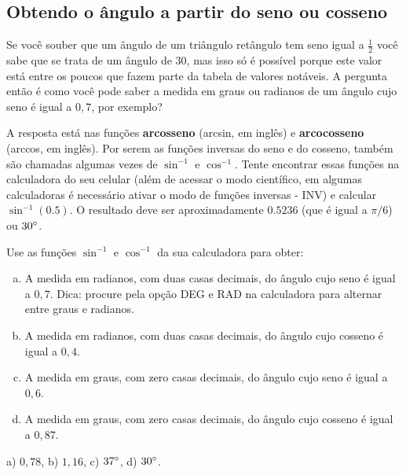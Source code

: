 \documentclass[main.tex]{subfiles}
\begin{document}
\subsection*{Obtendo o ângulo a partir do seno ou cosseno}

Se você souber que um ângulo de um triângulo retângulo tem seno igual a $\frac{1}{2}$ você sabe que se trata de um ângulo de 30\degree, mas isso só é possível porque este valor está entre os poucos que fazem parte da tabela de valores notáveis. A pergunta então é como você pode saber a medida em graus ou radianos de um ângulo cujo seno é igual a $0,7$, por exemplo?

A resposta está nas funções \textbf{arcosseno} (arcsin, em inglês) e \textbf{arcocosseno} (arccos, em inglês). Por serem as funções inversas do seno e do cosseno, também são chamadas algumas vezes de $\sin^{-1}$ e $\cos^{-1}$. Tente encontrar essas funções na calculadora do seu celular (além de acessar o modo científico, em algumas calculadoras é necessário ativar o modo de funções inversas - INV) e calcular $\sin^{-1}(0.5)$. O resultado deve ser aproximadamente $0.5236$ (que é igual a $\pi/6$) ou $30\degree$.

\begin{questao}
 Use as funções $\sin^{-1}$ e $\cos^{-1}$ da sua calculadora para obter:
\begin{enumerate}[a)]
\item A medida em radianos, com duas casas decimais, do ângulo cujo seno é igual a $0,7$. Dica: procure pela opção DEG e RAD na calculadora para alternar entre graus e radianos.
\item A medida em radianos, com duas casas decimais, do ângulo cujo cosseno é igual a $0,4$.
\item A medida em graus, com zero casas decimais, do ângulo cujo seno é igual a $0,6$. 
\item A medida em graus, com zero casas decimais, do ângulo cujo cosseno é igual a $0,87$.
\end{enumerate}
\end{questao}

\begin{gabarito}
	\begin{gabaritoQuestao}
		a) $0,78$, b) $1,16$, c) $37\degree$, d) $30\degree$.
	\end{gabaritoQuestao}
\end{gabarito}
\end{document}
